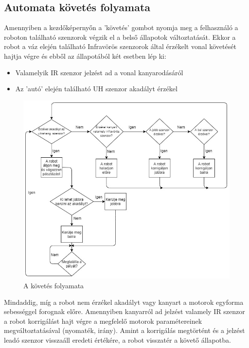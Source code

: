 \documentclass[]{thesis-ekf}
\theoremstyle{definition}
\begin{document}
\subsection{Automata követés folyamata}\label{followkepernyo_allapot}
Amennyiben a kezdőképernyőn a ’követés’ gombot nyomja meg a felhasználó a roboton található szenzorok végzik el a belső állapotok változtatását.
Ekkor a robot a váz elején található Infravörös szenzorok által érzékelt vonal követését hajtja végre és ebből az állapotából két esetben lép ki:
\begin{itemize}
	\item Valamelyik IR szenzor jelzést ad a vonal kanyarodásáról
	\item Az 'autó' elején található UH szenzor akadályt érzékel
\end{itemize}
\begin{figure}[h]
	\centering
	\includegraphics[width=\columnwidth]{images/grafok/kovetes_graf}
	\caption{A követés folyamata}
	\label{kovetes_graf}
\end{figure}

Mindaddig, míg a robot nem érzékel akadályt vagy kanyart a motorok egyforma sebességgel forognak előre. Amennyiben kanyarról ad jelzést valamely IR szenzor a robot korrigálást hajt végre a megfelelő motorok paramétereinek megváltoztatásával (nyomaték, irány). Amint a korrigálás megtörtént és a jelzést leadó szenzor visszaáll eredeti értékére, a robot visszatér a követő állapotba.
\end{document}
